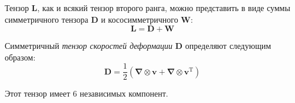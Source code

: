 Тензор $\mathbf{L}$, как и всякий тензор второго ранга, можно представить в виде суммы симметричного тензора $\mathbf{D}$ и кососимметричного $\mathbf{W}$:
\begin{equation*}
\mathbf{L}=\mathbf{D}+\mathbf{W} 
\end{equation*}

\begin{definition*}
  Симметричный \emph{тензор скоростей деформации} $\mathbf{D}$ определяют
  следующим образом:
\begin{equation*}
\mathbf{D}=\frac{1}{2}\left(\boldsymbol{\nabla} \otimes \mathbf{v}+\boldsymbol{\nabla} \otimes \mathbf{v}^{\mathrm{T}}\right) 
\end{equation*}
\end{definition*}
Этот тензор имеет 6 независимых компонент.

